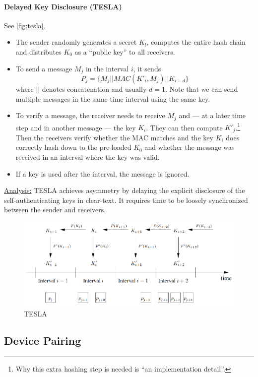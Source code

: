 \paragraph{Delayed Key Disclosure (TESLA)}
See \autoref{fig:tesla}.
\begin{itemize}
	\item The sender randomly generates a secret $K_l$, computes the entire hash chain and distributes $K_0$ as a ``public key'' to all receivers.
	\item To send a message $M_j$ in the interval $i$, it sends
	\[P_j = \{ M_j || MAC(K'_i, M_j) || K_{i-d} \} \]
	where $||$ denotes concatenation and usually $d=1$.
	Note that we can send multiple messages in the same time interval using the same key.
	\item To verify a message, the receiver needs to receive $M_j$ and --- at a later time step and in another message --- the key $K_i$.
	They can then compute $K'_j$.\footnote{Why this extra hashing step is needed is ``an implementation detail''.}
	\\
	Then the receivers verify whether the MAC matches and the key $K_i$ does correctly hash down to the pre-loaded $K_0$ and whether the message was received in an interval where the key was valid.
	\item If a key is used after the interval, the message is ignored.
\end{itemize}

\underline{Analysis:} TESLA achieves asymmetry by delaying the explicit disclosure of the self-authenticating keys in clear-text.
It requires time to be loosely synchronized between the sender and receivers.

\begin{figure}[h]
	\centering
	\includegraphics[scale=0.6]{images/8-tesla.png}
	\caption{TESLA}%
	\label{fig:tesla}
\end{figure}

\subsection{Device Pairing}

